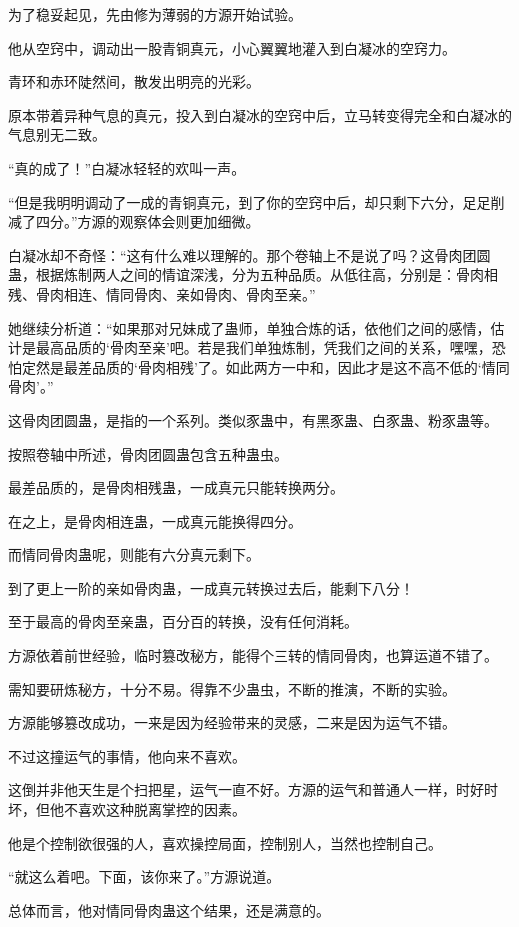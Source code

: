 \begin{this_body}
为了稳妥起见，先由修为薄弱的方源开始试验。

他从空窍中，调动出一股青铜真元，小心翼翼地灌入到白凝冰的空窍力。

青环和赤环陡然间，散发出明亮的光彩。

原本带着异种气息的真元，投入到白凝冰的空窍中后，立马转变得完全和白凝冰的气息别无二致。

“真的成了！”白凝冰轻轻的欢叫一声。

“但是我明明调动了一成的青铜真元，到了你的空窍中后，却只剩下六分，足足削减了四分。”方源的观察体会则更加细微。

白凝冰却不奇怪：“这有什么难以理解的。那个卷轴上不是说了吗？这骨肉团圆蛊，根据炼制两人之间的情谊深浅，分为五种品质。从低往高，分别是：骨肉相残、骨肉相连、情同骨肉、亲如骨肉、骨肉至亲。”

她继续分析道：“如果那对兄妹成了蛊师，单独合炼的话，依他们之间的感情，估计是最高品质的‘骨肉至亲’吧。若是我们单独炼制，凭我们之间的关系，嘿嘿，恐怕定然是最差品质的‘骨肉相残’了。如此两方一中和，因此才是这不高不低的‘情同骨肉’。”

这骨肉团圆蛊，是指的一个系列。类似豕蛊中，有黑豕蛊、白豕蛊、粉豕蛊等。

按照卷轴中所述，骨肉团圆蛊包含五种蛊虫。

最差品质的，是骨肉相残蛊，一成真元只能转换两分。

在之上，是骨肉相连蛊，一成真元能换得四分。

而情同骨肉蛊呢，则能有六分真元剩下。

到了更上一阶的亲如骨肉蛊，一成真元转换过去后，能剩下八分！

至于最高的骨肉至亲蛊，百分百的转换，没有任何消耗。

方源依着前世经验，临时篡改秘方，能得个三转的情同骨肉，也算运道不错了。

需知要研炼秘方，十分不易。得靠不少蛊虫，不断的推演，不断的实验。

方源能够篡改成功，一来是因为经验带来的灵感，二来是因为运气不错。

不过这撞运气的事情，他向来不喜欢。

这倒并非他天生是个扫把星，运气一直不好。方源的运气和普通人一样，时好时坏，但他不喜欢这种脱离掌控的因素。

他是个控制欲很强的人，喜欢操控局面，控制别人，当然也控制自己。

“就这么着吧。下面，该你来了。”方源说道。

总体而言，他对情同骨肉蛊这个结果，还是满意的。


\end{this_body}
